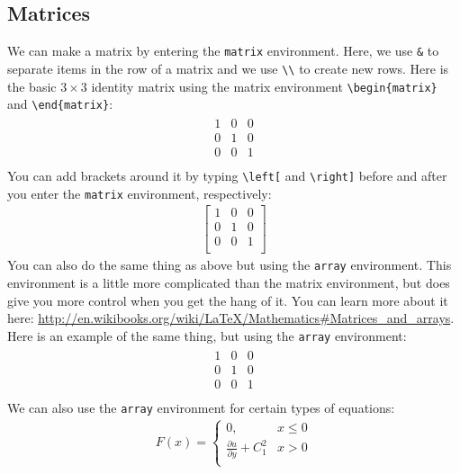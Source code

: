 \documentclass[]{article}%
\newcommand{\bs}{\textbackslash}
\newcommand{\TT}[1]{\texttt{#1}}
\theoremstyle{definition}
\begin{document}
\subsection{Matrices}
\label{sec:matrices}
We can make a matrix by entering the \TT{matrix} environment.
Here, we use \TT{\&} to separate items in the row of a matrix and we use \TT{\bs\bs} to create new rows.
Here is the basic $3 \times 3$ identity matrix using the matrix environment \TT{\bs begin\{matrix\}} and \TT{\bs end\{matrix\}}:
\begin{align*}
	\begin{matrix}
   		1 & 0 & 0 \\
     	0 & 1 & 0 \\
     	0 & 0 & 1 \\
    \end{matrix}
\end{align*}
You can add brackets around it by typing \TT{\bs left[} and \TT{\bs right]} before and after you enter the \TT{matrix} environment, respectively:
\begin{align*}
\left[
	\begin{matrix}
		1 & 0 & 0 \\
		0 & 1 & 0 \\
		0 & 0 & 1 \\
	\end{matrix}
\right]
\end{align*}
%
You can also do the same thing as above but using the \TT{array} environment.
This environment is a little more complicated than the matrix environment, but does give you more control when you get the hang of it.
You can learn more about it here: \url{http://en.wikibooks.org/wiki/LaTeX/Mathematics#Matrices_and_arrays}.
Here is an example of the same thing, but using the \TT{array} environment:
\begin{align*}
	\begin{array}{ccc}
		1 & 0 & 0 \\
		0 & 1 & 0 \\
		0 & 0 & 1 \\
	\end{array}
\end{align*}
%
We can also use the \TT{array} environment for certain types of equations:
\begin{align}
F(x) = \left\{ 
\begin{array}{ll}
	0, & x \leq 0 \\
	\frac{\partial u}{\partial y} + C_1^2  & x > 0\\
\end{array}
\right. 
\end{align}
\end{document}
